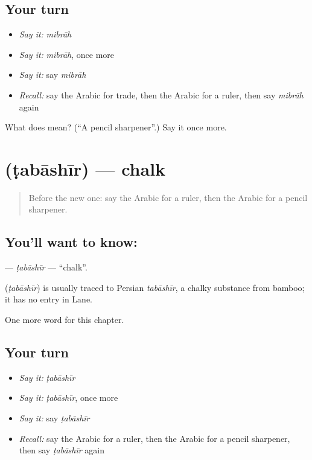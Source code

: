 \subsection*{Your turn}
\begin{itemize}
\raggedright
  \item \emph{Say it:} \emph{mibrāh}
  \item \emph{Say it:} \emph{mibrāh}, once more
  \item \emph{Say it:} say \emph{mibrāh}
  \item \emph{Recall:} say the Arabic for trade, then the Arabic for a ruler, then say \emph{mibrāh} again
\end{itemize}

\begin{tcolorbox}[breakable,colback=teal!4,colframe=teal!35!black,title={Before you move on}]
What does  mean? (\textquotedblleft{}A pencil sharpener\textquotedblright{}.) Say it once more.
\end{tcolorbox}
\section[\texorpdfstring{\ar{طباشير} (ṭabāshīr)}{طباشير (ṭabāshīr)}]{ (ṭabāshīr) — chalk}

\label{lesson:AR-C253-tabashir}



\begin{quote}
Before the new one: say the Arabic for a ruler, then the Arabic for a pencil sharpener.
\end{quote}

\subsection*{You'll want to know: }
\textbf{} — \emph{ṭabāshīr} — \textquotedblleft{}chalk\textquotedblright{}.

\begin{cousinweb}
\textbf{} (\emph{ṭabāshīr}) is usually traced to Persian \emph{tabāshīr}, a chalky substance from bamboo; it has no entry in Lane.
\end{cousinweb}

\begin{grammarlens}[title={What you've built}]
One more word for this chapter.
\end{grammarlens}

\subsection*{Your turn}
\begin{itemize}
\raggedright
  \item \emph{Say it:} \emph{ṭabāshīr}
  \item \emph{Say it:} \emph{ṭabāshīr}, once more
  \item \emph{Say it:} say \emph{ṭabāshīr}
  \item \emph{Recall:} say the Arabic for a ruler, then the Arabic for a pencil sharpener, then say \emph{ṭabāshīr} again
\end{itemize}

